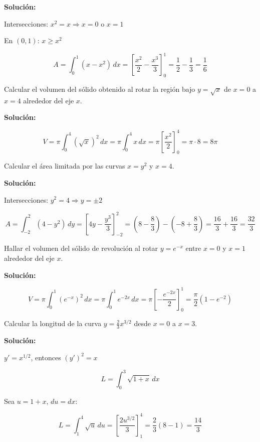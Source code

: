 \documentclass[12pt, a4paper]{book}
\begin{document}
\textbf{Solución:}

Intersecciones: $x^2 = x \Rightarrow x = 0$ o $x = 1$

En $(0,1)$: $x \geq x^2$

\[
A = \int_0^1 (x - x^2) \, dx = [\frac{x^2}{2} - \frac{x^3}{3}]_0^1 = \frac{1}{2} - \frac{1}{3} = \frac{1}{6}
\]

\begin{ejercicio}
Calcular el volumen del sólido obtenido al rotar la región bajo $y = \sqrt{x}$ de $x = 0$ a $x = 4$ alrededor del eje $x$.
\end{ejercicio}

\textbf{Solución:}

\[
V = \pi \int_0^4 (\sqrt{x})^2 \, dx = \pi \int_0^4 x \, dx = \pi [\frac{x^2}{2}]_0^4 = \pi \cdot 8 = 8\pi
\]

\begin{ejercicio}
Calcular el área limitada por las curvas $x = y^2$ y $x = 4$.
\end{ejercicio}

\textbf{Solución:}

Intersecciones: $y^2 = 4 \Rightarrow y = \pm 2$

\[
A = \int_{-2}^2 (4 - y^2) \, dy = [4y - \frac{y^3}{3}]_{-2}^2 = (8 - \frac{8}{3}) - (-8 + \frac{8}{3}) = \frac{16}{3} + \frac{16}{3} = \frac{32}{3}
\]

\begin{ejercicio}
Hallar el volumen del sólido de revolución al rotar $y = e^{-x}$ entre $x = 0$ y $x = 1$ alrededor del eje $x$.
\end{ejercicio}

\textbf{Solución:}

\[
V = \pi \int_0^1 (e^{-x})^2 \, dx = \pi \int_0^1 e^{-2x} \, dx = \pi [-\frac{e^{-2x}}{2}]_0^1 = \frac{\pi}{2}(1 - e^{-2})
\]

\begin{ejercicio}
Calcular la longitud de la curva $y = \frac{2}{3}x^{3/2}$ desde $x = 0$ a $x = 3$.
\end{ejercicio}

\textbf{Solución:}

$y' = x^{1/2}$, entonces $(y')^2 = x$

\[
L = \int_0^3 \sqrt{1+x} \, dx
\]

Sea $u = 1+x$, $du = dx$:

\[
L = \int_1^4 \sqrt{u} \, du = [\frac{2u^{3/2}}{3}]_1^4 = \frac{2}{3}(8 - 1) = \frac{14}{3}
\]

\end{document}
